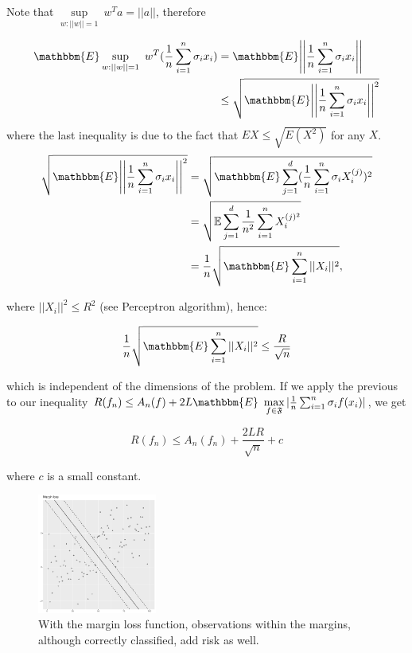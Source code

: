 \documentclass[11pt, english]{article}
\begin{document}
Note that $\sup\limits_{w:||w||=1} \ w^T a = ||a||$, therefore
 
\begin{align} %
	 \mathbbm{E} \sup\limits_{w:||w||=1} \ w^T(\frac{1}{n} \sum_{i=1}^{n} \sigma_i x_i) &=\mathbbm{E} \Bigg|\Bigg|\frac{1}{n} \sum_{i=1}^{n} \sigma_i x_i\Bigg|\Bigg|\\
 	 &\leq \sqrt{\mathbbm{E}\Bigg|\Bigg|\frac{1}{n} \sum_{i=1}^{n} \sigma_i x_i\Bigg|\Bigg|^2}
\end{align}
where the last inequality is due to the fact that $EX \leq \sqrt{E(X^2)}$ for any $X$.
\begin{align}%
 	 \sqrt{\mathbbm{E}\Bigg|\Bigg|\frac{1}{n} \sum_{i=1}^{n} \sigma_i x_i\Bigg|\Bigg|^2}&= \sqrt{\mathbbm{E} \sum_{j=1}^{d} (\frac{1}{n} \sum_{i=1}^{n} \sigma_i X_i^{(j)})^2}\\
 	 &=\sqrt{\mathbb{E}\sum_{j=1}^{d}\frac{1}{n^2}\sum_{i=1}^{n}X_i^{(j)^2}}\\
	 &= \frac{1}{n} \sqrt{\mathbbm{E} \sum_{i=1}^{n} ||X_i||^2},
\end{align}
 
where $||X_i||^2 \leq R^2$ (see Perceptron algorithm), hence: %

\begin{equation}
\frac{1}{n} \sqrt{\mathbbm{E} \sum_{i=1}^{n} ||X_i||^2} \leq \frac{R}{\sqrt{n}}
\end{equation}

 
which is independent of the dimensions of the problem. If we apply the previous to our inequality $R(f_n) \leq A_n(f) + 2L \mathbbm{E}\ \max\limits_{f \in \mathfrak{F}} |\frac{1}{n} \sum_{i=1}^{n}\sigma_i f(x_i)|$, we get %
 
\begin{equation}
R(f_n) \leq A_n(f_n) + \frac{2LR}{\sqrt{n}} + c
\end{equation} 


 
where $c$ is a small constant.\\
 
 
\begin{figure}
 	\centering
 	\includegraphics[width=0.35\textwidth]{marginloss.pdf}
 	\caption{\small With the margin loss function, observations within the margins, although correctly classified, add risk as well.}
\end{figure}
 
\end{document}
